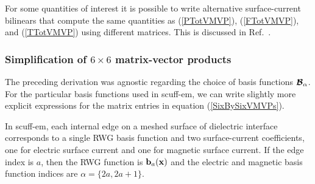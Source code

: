 \documentclass[letterpaper]{article}
\newcommand{\citeasnoun}[1]{Ref.~\citenum{#1}}
\begin{document}
For some quantities of interest it is possible to write alternative
surface-current bilinears that compute the same quantities as 
(\ref{PTotVMVP}), (\ref{FTotVMVP}), and (\ref{TTotVMVP})
using different matrices. This is discussed 
in \citeasnoun{Reid2013a}.

\subsubsection*{Simplification of $6\times 6$ matrix-vector
                products}

The preceding derivation was agnostic regarding the
choice of basis functions $\boldsymbol{\mathcal{B}}_\alpha$. For the
particular basis functions used in {\sc scuff-em},
we can write slightly more explicit expressions
for the matrix entries in equation (\ref{SixBySixVMVPs}).

In {\sc scuff-em}, each internal edge on a meshed
surface of dielectric interface corresponds
to a single RWG basis function and two surface-current
coefficients, one for electric surface current and one 
for magnetic surface current. If the edge index is $a$, 
then the RWG function is $\mathbf{b}_a(\mathbf{x})$ and the 
electric and magnetic basis function indices are 
$\alpha=\{2a, 2a+1\}$. 
\end{document}
